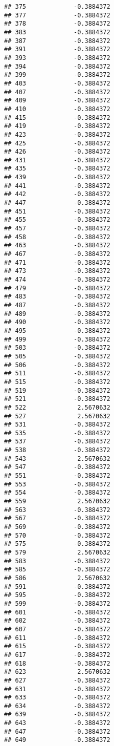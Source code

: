 \documentclass[
]{article}
\begin{document}
\begin{verbatim}
## 375             -0.3884372
## 377             -0.3884372
## 378             -0.3884372
## 383             -0.3884372
## 387             -0.3884372
## 391             -0.3884372
## 393             -0.3884372
## 394             -0.3884372
## 399             -0.3884372
## 403             -0.3884372
## 407             -0.3884372
## 409             -0.3884372
## 410             -0.3884372
## 415             -0.3884372
## 419             -0.3884372
## 423             -0.3884372
## 425             -0.3884372
## 426             -0.3884372
## 431             -0.3884372
## 435             -0.3884372
## 439             -0.3884372
## 441             -0.3884372
## 442             -0.3884372
## 447             -0.3884372
## 451             -0.3884372
## 455             -0.3884372
## 457             -0.3884372
## 458             -0.3884372
## 463             -0.3884372
## 467             -0.3884372
## 471             -0.3884372
## 473             -0.3884372
## 474             -0.3884372
## 479             -0.3884372
## 483             -0.3884372
## 487             -0.3884372
## 489             -0.3884372
## 490             -0.3884372
## 495             -0.3884372
## 499             -0.3884372
## 503             -0.3884372
## 505             -0.3884372
## 506             -0.3884372
## 511             -0.3884372
## 515             -0.3884372
## 519             -0.3884372
## 521             -0.3884372
## 522              2.5670632
## 527              2.5670632
## 531             -0.3884372
## 535             -0.3884372
## 537             -0.3884372
## 538             -0.3884372
## 543              2.5670632
## 547             -0.3884372
## 551             -0.3884372
## 553             -0.3884372
## 554             -0.3884372
## 559              2.5670632
## 563             -0.3884372
## 567             -0.3884372
## 569             -0.3884372
## 570             -0.3884372
## 575             -0.3884372
## 579              2.5670632
## 583             -0.3884372
## 585             -0.3884372
## 586              2.5670632
## 591             -0.3884372
## 595             -0.3884372
## 599             -0.3884372
## 601             -0.3884372
## 602             -0.3884372
## 607             -0.3884372
## 611             -0.3884372
## 615             -0.3884372
## 617             -0.3884372
## 618             -0.3884372
## 623              2.5670632
## 627             -0.3884372
## 631             -0.3884372
## 633             -0.3884372
## 634             -0.3884372
## 639             -0.3884372
## 643             -0.3884372
## 647             -0.3884372
## 649             -0.3884372

\end{verbatim}
\end{document}
